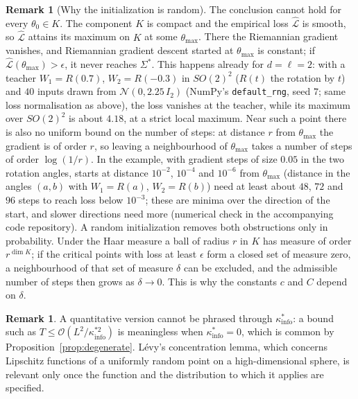 \documentclass[11pt,reqno]{amsart}
\theoremstyle{definition}
\newtheorem{remark}[theorem]{Remark}
\newcommand{\Loss}{\mathcal{L}}
\numberwithin{equation}{section}
\begin{document}
\begin{remark}[Why the initialization is random]
The conclusion cannot hold for every $\theta_0 \in K$. The component $K$ is compact and the empirical loss $\hat{\Loss}$ is smooth, so $\hat{\Loss}$ attains its maximum on $K$ at some $\theta_{\max}$. There the Riemannian gradient vanishes, and Riemannian gradient descent started at $\theta_{\max}$ is constant; if $\hat{\Loss}(\theta_{\max}) > \epsilon$, it never reaches $\Sigma^*$. This happens already for $d = \ell = 2$: with a teacher $W_1 = R(0.7)$, $W_2 = R(-0.3)$ in $SO(2)^2$ ($R(t)$ the rotation by $t$) and $40$ inputs drawn from $\mathcal{N}(0, 2.25\,I_2)$ (NumPy's \texttt{default\_rng}, seed $7$; same loss normalisation as above), the loss vanishes at the teacher, while its maximum over $SO(2)^2$ is about $4.18$, at a strict local maximum. Near such a point there is also no uniform bound on the number of steps: at distance $r$ from $\theta_{\max}$ the gradient is of order $r$, so leaving a neighbourhood of $\theta_{\max}$ takes a number of steps of order $\log(1/r)$. In the example, with gradient steps of size $0.05$ in the two rotation angles, starts at distance $10^{-2}$, $10^{-4}$ and $10^{-6}$ from $\theta_{\max}$ (distance in the angles $(a,b)$ with $W_1 = R(a)$, $W_2 = R(b)$) need at least about $48$, $72$ and $96$ steps to reach loss below $10^{-3}$; these are minima over the direction of the start, and slower directions need more (numerical check in the accompanying code repository). A random initialization removes both obstructions only in probability. Under the Haar measure a ball of radius $r$ in $K$ has measure of order $r^{\dim K}$; if the critical points with loss at least $\epsilon$ form a closed set of measure zero, a neighbourhood of that set of measure $\delta$ can be excluded, and the admissible number of steps then grows as $\delta \to 0$. This is why the constants $c$ and $C$ depend on $\delta$.
\end{remark}

\begin{remark}
A quantitative version cannot be phrased through $\kappa^*_{\mathrm{info}}$: a bound such as $T \le \mathcal{O}(L^2/\kappa^{*2}_{\mathrm{info}})$ is meaningless when $\kappa^*_{\mathrm{info}} = 0$, which is common by Proposition~\ref{prop:degenerate}. L\'evy's concentration lemma, which concerns Lipschitz functions of a uniformly random point on a high-dimensional sphere, is relevant only once the function and the distribution to which it applies are specified.
\end{remark}
\end{document}
